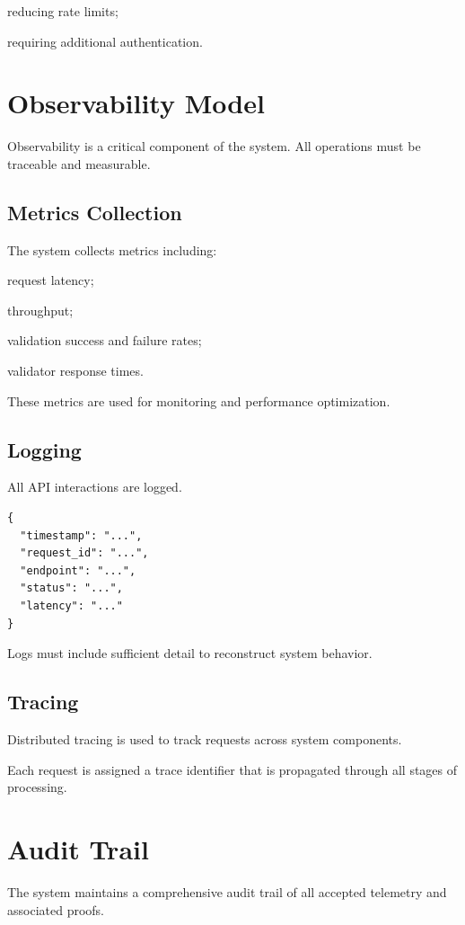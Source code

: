 reducing rate limits;

requiring additional authentication.

\section{Observability Model}

Observability is a critical component of the system. All operations must be traceable and measurable.

\subsection{Metrics Collection}

The system collects metrics including:

request latency;

throughput;

validation success and failure rates;

validator response times.

These metrics are used for monitoring and performance optimization.

\subsection{Logging}

All API interactions are logged.

\begin{verbatim}
{
  "timestamp": "...",
  "request_id": "...",
  "endpoint": "...",
  "status": "...",
  "latency": "..."
}
\end{verbatim}

Logs must include sufficient detail to reconstruct system behavior.

\subsection{Tracing}

Distributed tracing is used to track requests across system components.

Each request is assigned a trace identifier that is propagated through all stages of processing.

\section{Audit Trail}

The system maintains a comprehensive audit trail of all accepted telemetry and associated proofs.

